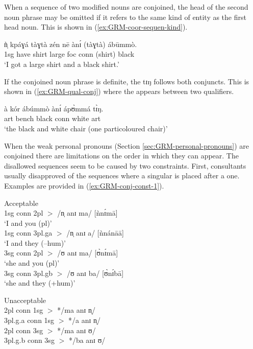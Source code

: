\begin{exe}
\begin{exe}
\begin{exe}
\begin{exe}
\begin{exe}
\begin{exe}
\begin{exe}
\begin{exe}
\begin{exe}
\begin{exe}
When a sequence of  two  modified nouns are conjoined, the head of the second
noun phrase may be omitted if it refers to the same kind of entity as
the first head noun. This is shown in (\ref{ex:GRM-coor-sequen-kind}).


 \ea\label{ex:GRM-coor-sequen-kind}
 \gll ǹ̩ kpáɣá tàɣtà zén nē ànɪ́ (tàɣtà) ábūmmò.\\
{\sc 1sg} have shirt large  {\sc foc} {\sc conn} (shirt)  black\\
 \glt   `I got a large shirt and a black shirt.'
\z

If the conjoined noun phrase is definite, the  {\sls tɪŋ}
follows both conjuncts. This is shown in (\ref{ex:GRM-qual-conj}) where the
 appears between two qualifiers.

 \ea\label{ex:GRM-qual-conj}
 \gll   à kór ábúmmò ànɪ́ ápʊ̀mmá tɪ̀ŋ.\\
{\sc art}  bench black {\sc conn} white {\sc art}\\
 \glt   `the black and white chair (one particoloured chair)'
\z

When the weak personal pronouns (Section \ref{sec:GRM-personal-pronouns}) are conjoined there are limitations on the order in which they can 
appear. The disallowed sequences seem to be caused by two constraints. First, consultants usually 
disapproved of  the sequences where a singular  is placed after a  one. Examples are 
provided in (\ref{ex:GRM-conj-const-1}).



\ea\label{ex:GRM-conj-const-1}
\ea\label{ex:GRM-conj-const-1-g}{\rm Acceptable}\\
{\sc 1sg  conn 2pl} $>$ /{\sls n̩ anɪ ma}/ [ǹnɪ́mā] \\
{\rm `I and you ({\sc pl})'}\\
{\sc 1sg  conn 3pl.g}a  $>$   /{\sls n̩ anɪ a}/ [ǹnánāā]\\
{\rm  `I and they ({\sc --hum})'}\\
{\sc 3sg   conn 2pl} $>$ /{\sls ʊ anɪ ma}/ [ʊ̀nɪ́mā]\\
{\rm   `she and you ({\sc pl})'}\\
{\sc 3sg conn 3pl.g}b $>$   /{\sls ʊ anɪ ba}/ [ʊ̀nɪ́bā]\\
{\rm  `she and they ({\sc +hum})'}


\ex\label{ex:GRM-conj-const-1-ng}{\rm Unacceptable}\\
{\sc  2pl conn 1sg}   $>$ *{\sls /ma  anɪ n̩/}\\
{\sc 3pl.g.}a   {\sc conn 1sg}  $>$  *{\sls /a anɪ n̩/}\\
{\sc  2pl conn 3sg} $>$ */ma anɪ ʊ/\\
{\sc 3pl.g.}b  {\sc conn 3sg} $>$ *{\sls /ba anɪ ʊ/}\\


\end{exe}
\end{exe}
\end{exe}
\end{exe}
\end{exe}
\end{exe}
\end{exe}
\end{exe}
\end{exe}
\end{exe}

